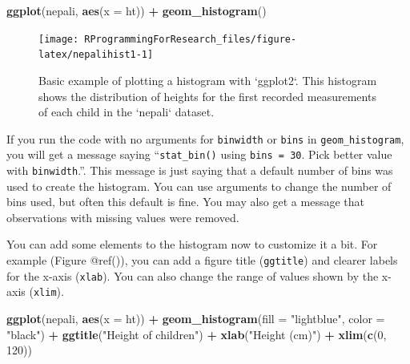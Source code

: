 \documentclass[]{book}
\makeatletter
\newenvironment{Shaded}{\begin{snugshade}}{\end{snugshade}}
\newcommand{\KeywordTok}[1]{\textcolor[rgb]{0.13,0.29,0.53}{\textbf{#1}}}
\newcommand{\DataTypeTok}[1]{\textcolor[rgb]{0.13,0.29,0.53}{#1}}
\newcommand{\DecValTok}[1]{\textcolor[rgb]{0.00,0.00,0.81}{#1}}
\newcommand{\StringTok}[1]{\textcolor[rgb]{0.31,0.60,0.02}{#1}}
\newcommand{\OperatorTok}[1]{\textcolor[rgb]{0.81,0.36,0.00}{\textbf{#1}}}
\newcommand{\NormalTok}[1]{#1}
\newenvironment{kframe}{%
\medskip{}
\setlength{\fboxsep}{.8em}
 \def\at@end@of@kframe{}%
 \ifinner\ifhmode%
  \def\at@end@of@kframe{\end{minipage}}%
  \begin{minipage}{\columnwidth}%
 \fi\fi%
 \def\FrameCommand##1{\hskip\@totalleftmargin \hskip-\fboxsep
 \colorbox{shadecolor}{##1}\hskip-\fboxsep
     \hskip-\linewidth \hskip-\@totalleftmargin \hskip\columnwidth}%
 \MakeFramed {\advance\hsize-\width
   \@totalleftmargin\z@ \linewidth\hsize
   \@setminipage}}%
 {\par\unskip\endMakeFramed%
 \at@end@of@kframe}
\renewenvironment{Shaded}{\begin{kframe}}{\end{kframe}}
\newenvironment{rmdblock}[1]
  {
  \begin{itemize}
  \renewcommand{\labelitemi}{
    \raisebox{-.7\height}[0pt][0pt]{
      {\setkeys{Gin}{width=3em,keepaspectratio}\texttt{[image: images/\#1]}}
    }
  }
  \setlength{\fboxsep}{1em}
  \begin{kframe}
  \item
  }
  {
  \end{kframe}
  \end{itemize}
  }
\newenvironment{rmdnote}
  {\begin{rmdblock}{note}}
  {\end{rmdblock}}
\theoremstyle{definition}
\theoremstyle{definition}
\theoremstyle{definition}
\theoremstyle{remark}
\makeatother
\begin{document}
\begin{Shaded}
\begin{Highlighting}[]
\KeywordTok{ggplot}\NormalTok{(nepali, }\KeywordTok{aes}\NormalTok{(}\DataTypeTok{x =}\NormalTok{ ht)) }\OperatorTok{+}\StringTok{ }
\StringTok{  }\KeywordTok{geom_histogram}\NormalTok{()}
\end{Highlighting}
\end{Shaded}

\begin{figure}

{\centering \texttt{[image: RProgrammingForResearch\_files/figure-latex/nepalihist1-1]} 

}

\caption{Basic example of plotting a histogram with `ggplot2`. This histogram shows the distribution of heights for the first recorded measurements of each child in the `nepali` dataset.}\label{fig:nepalihist1}
\end{figure}

\begin{rmdnote}
If you run the code with no arguments for \texttt{binwidth} or
\texttt{bins} in \texttt{geom\_histogram}, you will get a message saying
``\texttt{stat\_bin()} using \texttt{bins\ =\ 30}. Pick better value
with \texttt{binwidth}.''. This message is just saying that a default
number of bins was used to create the histogram. You can use arguments
to change the number of bins used, but often this default is fine. You
may also get a message that observations with missing values were
removed.
\end{rmdnote}

You can add some elements to the histogram now to customize it a bit.
For example (Figure @ref()), you can add a figure title
(\texttt{ggtitle}) and clearer labels for the x-axis (\texttt{xlab}).
You can also change the range of values shown by the x-axis
(\texttt{xlim}).

\begin{Shaded}
\begin{Highlighting}[]
\KeywordTok{ggplot}\NormalTok{(nepali, }\KeywordTok{aes}\NormalTok{(}\DataTypeTok{x =}\NormalTok{ ht)) }\OperatorTok{+}\StringTok{ }
\StringTok{  }\KeywordTok{geom_histogram}\NormalTok{(}\DataTypeTok{fill =} \StringTok{"lightblue"}\NormalTok{, }\DataTypeTok{color =} \StringTok{"black"}\NormalTok{) }\OperatorTok{+}\StringTok{ }
\StringTok{  }\KeywordTok{ggtitle}\NormalTok{(}\StringTok{"Height of children"}\NormalTok{) }\OperatorTok{+}\StringTok{ }
\StringTok{  }\KeywordTok{xlab}\NormalTok{(}\StringTok{"Height (cm)"}\NormalTok{) }\OperatorTok{+}\StringTok{ }\KeywordTok{xlim}\NormalTok{(}\KeywordTok{c}\NormalTok{(}\DecValTok{0}\NormalTok{, }\DecValTok{120}\NormalTok{))}
\end{Highlighting}
\end{Shaded}
\end{document}
